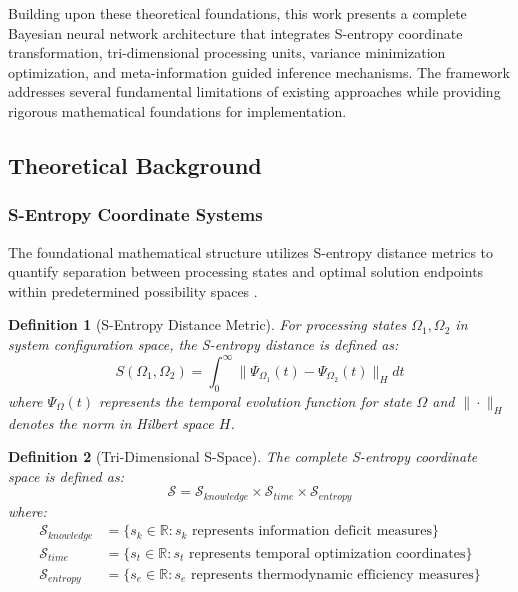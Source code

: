 \documentclass[12pt,a4paper]{article}
\newtheorem{definition}{Definition}
\begin{document}
Building upon these theoretical foundations, this work presents a complete Bayesian neural network architecture that integrates S-entropy coordinate transformation, tri-dimensional processing units, variance minimization optimization, and meta-information guided inference mechanisms. The framework addresses several fundamental limitations of existing approaches while providing rigorous mathematical foundations for implementation.

\subsection{Theoretical Background}

\subsubsection{S-Entropy Coordinate Systems}

The foundational mathematical structure utilizes S-entropy distance metrics to quantify separation between processing states and optimal solution endpoints within predetermined possibility spaces \cite{sachikonye2024sentropy}.

\begin{definition}[S-Entropy Distance Metric]
For processing states $\Omega_1, \Omega_2$ in system configuration space, the S-entropy distance is defined as:
\begin{equation}
S(\Omega_1, \Omega_2) = \int_0^{\infty} \|\Psi_{\Omega_1}(t) - \Psi_{\Omega_2}(t)\|_H dt
\end{equation}
where $\Psi_{\Omega}(t)$ represents the temporal evolution function for state $\Omega$ and $\|\cdot\|_H$ denotes the norm in Hilbert space $H$.
\end{definition}

\begin{definition}[Tri-Dimensional S-Space]
The complete S-entropy coordinate space is defined as:
\begin{equation}
\mathcal{S} = \mathcal{S}_{knowledge} \times \mathcal{S}_{time} \times \mathcal{S}_{entropy}
\end{equation}
where:
\begin{align}
\mathcal{S}_{knowledge} &= \{s_k \in \mathbb{R} : s_k \text{ represents information deficit measures}\} \\
\mathcal{S}_{time} &= \{s_t \in \mathbb{R} : s_t \text{ represents temporal optimization coordinates}\} \\
\mathcal{S}_{entropy} &= \{s_e \in \mathbb{R} : s_e \text{ represents thermodynamic efficiency measures}\}
\end{align}
\end{definition}
\end{document}
